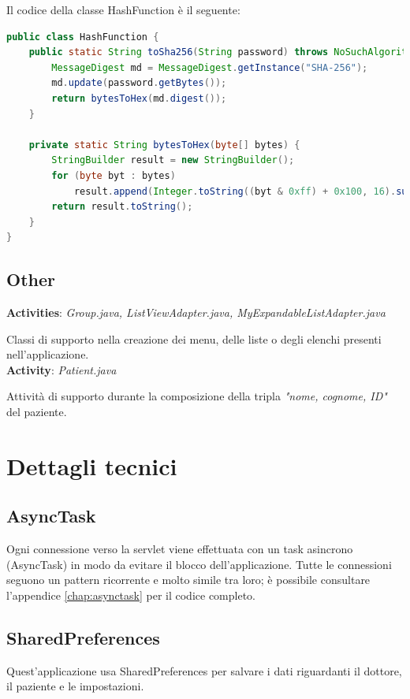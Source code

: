 \documentclass[
	corpo=12pt,
	twoside,
 	evenboxes,
	tipotesi=triennale,
    	stile=classica,
   	 greek,
]{toptesi}
\begin{document}
\newpage

Il codice della classe HashFunction è il seguente:

\begin{lstlisting}[language=Java, label=lst:sha256, caption={}]
public class HashFunction {
    public static String toSha256(String password) throws NoSuchAlgorithmException {
        MessageDigest md = MessageDigest.getInstance("SHA-256");
        md.update(password.getBytes());
        return bytesToHex(md.digest());
    }

    private static String bytesToHex(byte[] bytes) {
        StringBuilder result = new StringBuilder();
        for (byte byt : bytes)
            result.append(Integer.toString((byt & 0xff) + 0x100, 16).substring(1));
        return result.toString();
    }
}
\end{lstlisting}

\subsection{Other}
\label{subsec:other}
\textbf{Activities}: \textit{Group.java, ListViewAdapter.java, MyExpandableListAdapter.java}

Classi di supporto nella creazione dei menu, delle liste o degli elenchi presenti nell'applicazione.\\

\textbf{Activity}: \textit{Patient.java}

Attività di supporto durante la composizione della tripla \textit{"nome, cognome, ID"} del paziente.

\vfill

\newpage

\section{Dettagli tecnici}
\label{sec:dettaglitecnici}

\subsection{AsyncTask}
\label{subsec:asynctask}

Ogni connessione verso la servlet viene effettuata con un task asincrono (AsyncTask) in modo da evitare il blocco dell'applicazione. Tutte le connessioni seguono un pattern ricorrente e molto simile tra loro; è possibile consultare l'appendice \ref{chap:asynctask} per il codice completo.

\subsection{SharedPreferences}
\label{subsec:sharedpreferences}
Quest'applicazione usa SharedPreferences per salvare i dati riguardanti il dottore, il paziente e le impostazioni.
\end{document}
